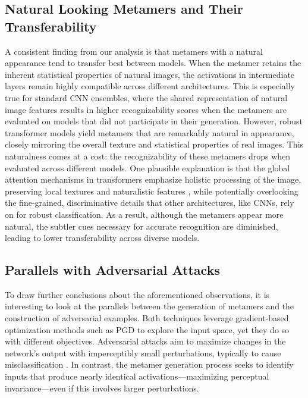 \documentclass[pdflatex,sn-mathphys-num]{sn-jnl}%
\theoremstyle{thmstyleone}%
\theoremstyle{thmstyletwo}%
\theoremstyle{thmstylethree}%
\begin{document}
\subsection{Natural Looking Metamers and Their Transferability}
A consistent finding from our analysis is that metamers with a natural appearance tend to transfer best between models. When the metamer retains the inherent statistical properties of natural images, the activations in intermediate layers remain highly compatible across different architectures. This is especially true for standard CNN ensembles, where the shared representation of natural image features results in higher recognizability scores when the metamers are evaluated on models that did not participate in their generation. 
However, robust transformer models yield metamers that are remarkably natural in appearance, closely mirroring the overall texture and statistical properties of real images. This naturalness comes at a cost: the recognizability of these metamers drops when evaluated across different models. One plausible explanation is that the global attention mechanisms in transformers emphasize holistic processing of the image, preserving local textures and naturalistic features \cite{naseer2021intriguing}, while potentially overlooking the fine-grained, discriminative details that other architectures, like CNNs, rely on for robust classification. As a result, although the metamers appear more natural, the subtler cues necessary for accurate recognition are diminished, leading to lower transferability across diverse models.

\subsection{Parallels with Adversarial Attacks}
To draw further conclusions about the aforementioned observations, it is interesting to look at the parallels between the generation of metamers and the construction of adversarial examples. Both techniques leverage gradient-based optimization methods such as PGD to explore the input space, yet they do so with different objectives. Adversarial attacks aim to maximize changes in the network’s output with imperceptibly small perturbations, typically to cause misclassification \cite{chakraborty2021survey}. In contrast, the metamer generation process seeks to identify inputs that produce nearly identical activations—maximizing perceptual invariance—even if this involves larger perturbations. 
\end{document}
